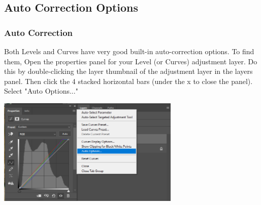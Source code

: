 \documentclass{beamer}
\begin{document}
			\subsection{Auto Correction Options}		
			\begin{frame}
				\frametitle{Auto Correction}
				\begin{outline}
					\1 Both Levels and Curves have very good built-in auto-correction options.
					\1 To find them, Open the properties panel for your Level (or Curves) adjustment layer.
					\2 Do this by double-clicking the layer thumbnail of the adjustment layer in the layers panel.
					\1 Then click the 4 stacked horizontal bars (under the x to close the panel).
					\1 Select "Auto Options..."
				\end{outline}
				\begin{center}
					\includegraphics[width=0.65\textwidth]{images/auto correction.png}
				\end{center}
			\end{frame}		
		
\end{document}
